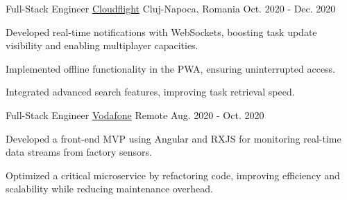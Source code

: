 \begin{cventries}
  \cventry
    {Full-Stack Engineer} %
    {\href{https://cloudflight.io}{Cloudflight}} %
    {Cluj-Napoca, Romania} %
    {Oct. 2020 - Dec. 2020} %
    {
      \begin{cvitems} %
        \item {Developed real-time notifications with WebSockets, boosting task update visibility and enabling multiplayer capacities.}
        \item {Implemented offline functionality in the PWA, ensuring uninterrupted access.}
        \item {Integrated advanced search features, improving task retrieval speed.}
      \end{cvitems}
    }

  \cventry
    {Full-Stack Engineer} %
    {\href{https://vodafone.com}{Vodafone}} %
    {Remote} %
    {Aug. 2020 - Oct. 2020} %
    {
      \begin{cvitems} %
        \item {Developed a front-end MVP using Angular and RXJS for monitoring real-time data streams from factory sensors.}
        \item {Optimized a critical microservice by refactoring code, improving efficiency and scalability while reducing maintenance overhead.}
      \end{cvitems}
    }

\end{cventries}
